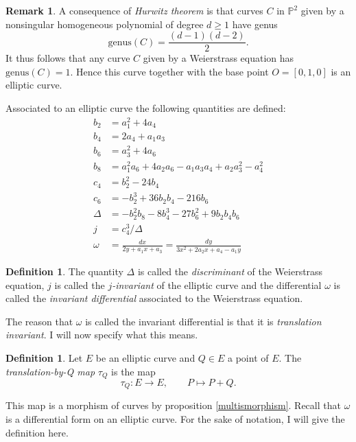 \documentclass{article}
\numberwithin{equation}{section}
\theoremstyle{definition}
\newtheorem{definition}[theorem]{Definition}
\newtheorem{remark}[theorem]{Remark}
\newcommand{\proj}[1]{{\mathbb P}^{#1}} %
\begin{document}
\begin{remark}\label{weierstrassmeanselliptic}
A consequence of \emph{Hurwitz theorem} \cite[II.5.9.]{Silverman} is that curves $C$ in $\proj{2}$ given by a nonsingular homogeneous polynomial of degree $d \ge 1$ have genus $$\text{genus}(C)=\frac{(d-1)(d-2)}{2}.$$ It thus follows that any curve $C$ given by a Weierstrass equation has $\text{genus}(C)=1$. Hence this curve together with the base point $O=[0,1,0]$ is an elliptic curve.
\end{remark}

Associated to an elliptic curve the following quantities are defined:
\begin{equation}\label{quantitiesellcurve}
\begin{align*}
b_2 &= a_1^2 +4a_4 \\
b_4 &= 2a_4+a_1a_3 \\
b_6 &= a_3^2+4a_6 \\
b_8 &= a_1^2a_6+4a_2a_6-a_1a_3a_4+a_2a_3^2-a_4^2 \\
c_4 &= b_2^2-24b_4 \\
c_6 &= -b_2^3+36b_2b_4-216b_6 \\
\Delta &= -b_2^2b_8 -8b_4^3-27b_6^2+9b_2b_4b_6 \\
j &= c_4^3/\Delta \\
\omega &= \frac{dx}{2y+a_1x+a_3} = \frac{dy}{3x^2+2a_2x+a_4-a_1y}
\end{align*}
\end{equation}

\begin{definition}\label{disc.omega.and.j}
The quantity $\Delta$ is called the \emph{discriminant} of the Weierstrass equation, $j$ is called the \emph{$j$-invariant} of the elliptic curve and the differential $\omega$ is called the \emph{invariant differential} associated to the Weierstrass equation.
\end{definition}

The reason that $\omega$ is called the invariant differential is that it is \emph{translation invariant}. I will now specify what this means.  

\begin{definition}\label{translationmap}
Let $E$ be an elliptic curve and $Q \in E$ a point of $E$. The \emph{translation-by-Q map} $\tau_Q$ is the map $$\tau_Q:E \rightarrow E, \qquad P \mapsto P+Q.$$
\end{definition}

This map is a morphism of curves by proposition \ref{multismorphism}. Recall that $\omega$ is a differential form on an elliptic curve. For the sake of notation, I will give the definition here.
\end{document}
